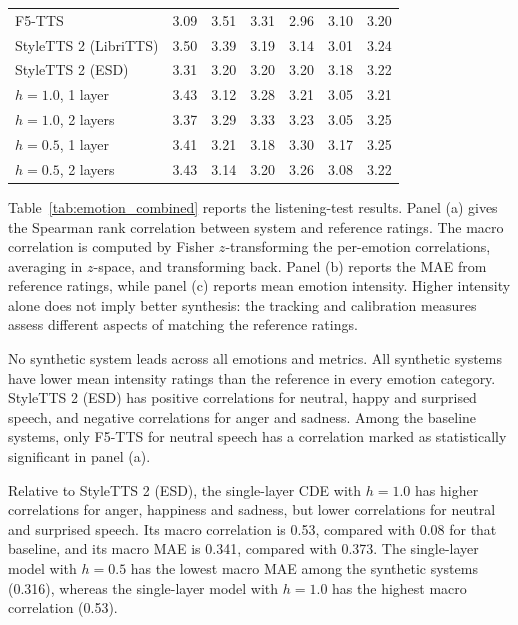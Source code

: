 \begin{table}[p]
\begin{tabular}{lrrrrrr}
    F5-TTS         & \cellcolor{worstred}3.09 & \cellcolor{bestblue}3.51 & \cellcolor{secondorange}3.31 & \cellcolor{worstred}2.96 & 3.10 & \cellcolor{worstred}3.20 \\
    StyleTTS 2 (LibriTTS) & \cellcolor{bestblue}3.50 & \cellcolor{secondorange}3.39 & 3.19 & 3.14 & \cellcolor{worstred}3.01 & \cellcolor{secondorange}3.24 \\
    StyleTTS 2 (ESD)  & 3.31 & 3.20 & 3.20 & 3.20 & \cellcolor{bestblue}3.18 & 3.22 \\
    $h=1.0$, 1 layer & \cellcolor{secondorange}3.43 & \cellcolor{worstred}3.12 & 3.28 & 3.21 & 3.05 & 3.21 \\
    $h=1.0$, 2 layers & 3.37 & 3.29 & \cellcolor{bestblue}3.33 & 3.23 & 3.05 & \cellcolor{bestblue}3.25 \\
    $h=0.5$, 1 layer & 3.41 & 3.21 & \cellcolor{worstred}3.18 & \cellcolor{bestblue}3.30 & \cellcolor{secondorange}3.17 & \cellcolor{bestblue}3.25 \\
    $h=0.5$, 2 layers & \cellcolor{secondorange}3.43 & 3.14 & 3.20 & \cellcolor{secondorange}3.26 & 3.08 & 3.22 \\
    \bottomrule
\end{tabular}
\end{table}

Table~\ref{tab:emotion_combined} reports the listening-test results. Panel (a) gives the Spearman rank correlation between system and reference ratings. The macro correlation is computed by Fisher $z$-transforming the per-emotion correlations, averaging in $z$-space, and transforming back. Panel (b) reports the \ac{MAE} from reference ratings, while panel (c) reports mean emotion intensity. Higher intensity alone does not imply better synthesis: the tracking and calibration measures assess different aspects of matching the reference ratings.

No synthetic system leads across all emotions and metrics. All synthetic systems have lower mean intensity ratings than the reference in every emotion category. StyleTTS 2 (\ac{ESD}) has positive correlations for neutral, happy and surprised speech, and negative correlations for anger and sadness. Among the baseline systems, only F5-TTS for neutral speech has a correlation marked as statistically significant in panel (a).

Relative to StyleTTS 2 (\ac{ESD}), the single-layer \ac{CDE} with $h=1.0$ has higher correlations for anger, happiness and sadness, but lower correlations for neutral and surprised speech. Its macro correlation is 0.53, compared with 0.08 for that baseline, and its macro \ac{MAE} is 0.341, compared with 0.373. The single-layer model with $h=0.5$ has the lowest macro \ac{MAE} among the synthetic systems (0.316), whereas the single-layer model with $h=1.0$ has the highest macro correlation (0.53).

